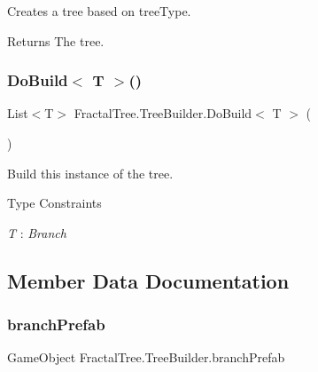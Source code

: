 Creates a tree based on tree\+Type. 

\begin{DoxyReturn}{Returns}
The tree.
\end{DoxyReturn}
\mbox{\label{class_fractal_tree_1_1_tree_builder_aa2d0ae2616577e6c0cdf7e68cdf4dffb}} 
\subsubsection{\texorpdfstring{Do\+Build$<$ T $>$()}{DoBuild< T >()}}
{\footnotesize\ttfamily List$<$T$>$ Fractal\+Tree.\+Tree\+Builder.\+Do\+Build$<$ T $>$ (\begin{DoxyParamCaption}{ }\end{DoxyParamCaption})\hspace{0.3cm}{\ttfamily [protected]}}



Build this instance of the tree. 

\begin{Desc}
\item[Type Constraints]\begin{description}
\item[{\em T} : {\em Branch}]\end{description}
\end{Desc}


\subsection{Member Data Documentation}
\mbox{\label{class_fractal_tree_1_1_tree_builder_a3cc99e5fd404b3916dc29f5dc5223d8c}} 
\subsubsection{\texorpdfstring{branch\+Prefab}{branchPrefab}}
{\footnotesize\ttfamily Game\+Object Fractal\+Tree.\+Tree\+Builder.\+branch\+Prefab}



